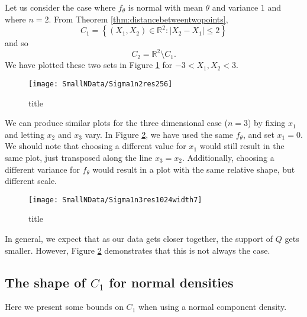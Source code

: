 	Let us consider the case where $f_\theta$ is normal with mean $\theta$ and variance $1$ and where $n=2$. From Theorem \ref{thm:distancebetweentwopoints},
	$$C_1 = \left \lbrace (X_1,X_2)\in \mathbb{R}^2 : |X_2 - X_1| \leq 2 \right\rbrace$$
	and so
	$$C_2 = \mathbb{R}^2 \setminus C_1.$$ We have plotted these two sets in Figure \ref{fig:phaseplotn2} for $-3<X_1,X_2<3$.
	\begin{figure}[ht]
		\centering
		\texttt{[image: SmallNData/Sigma1n2res256]}
		\caption{title}
		\label{fig:phaseplotn2}
	\end{figure}

	We can produce similar plots for the three dimensional case ($n=3$) by fixing $x_1$ and letting $x_2$ and $x_3$ vary. In Figure \ref{fig:phaseplotn3}, we have used the same $f_\theta$, and set $x_1 = 0$. We should note that choosing a different value for $x_1$ would still result in the same plot, just transposed along the line $x_3 = x_2$. Additionally, choosing a different variance for $f_\theta$ would result in a plot with the same relative shape, but different scale.

	\begin{figure}[ht]
		\centering
		\texttt{[image: SmallNData/Sigma1n3res1024width7]}
		\caption{title}
		\label{fig:phaseplotn3}
	\end{figure}

	In general, we expect that as our data gets closer together, the support of $Q$ gets smaller. However, Figure \ref{fig:phaseplotn3} demonstrates that this is not always the case.

	\subsection{The shape of \texorpdfstring{$C_1$}{C1} for normal densities}
	Here we present some bounds on $C_1$ when using a normal component density.

